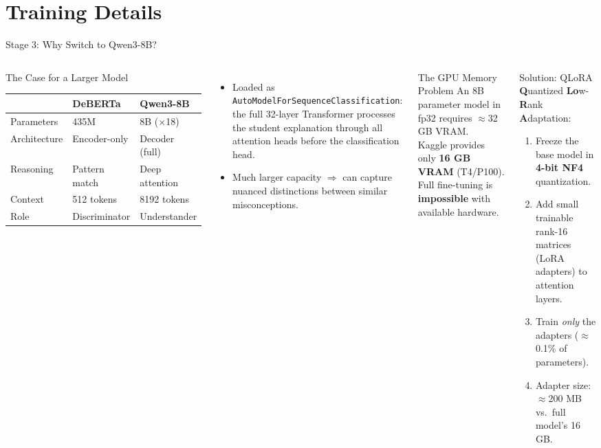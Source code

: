 ﻿\documentclass[aspectratio=169,10pt]{beamer}
\begin{document}
\section{Training Details}

\begin{frame}[shrink=4]{Stage 3: Why Switch to Qwen3-8B?}
\begin{columns}[T]
\begin{block}{The Case for a Larger Model}
\begin{tabular}{lll}
\toprule
 & \textbf{DeBERTa} & \textbf{Qwen3-8B}\\
\midrule
Parameters & 435M & 8B ($\times$18)\\
Architecture & Encoder-only & Decoder (full)\\
Reasoning & Pattern match & Deep attention\\
Context & 512 tokens & 8192 tokens\\
Role & Discriminator & Understander\\
\bottomrule
\end{tabular}
\end{block}
\vspace{8pt}
\begin{itemize}
  \item Loaded as \texttt{AutoModelForSequenceClassification}: the full 32-layer Transformer processes the student explanation through all attention heads before the classification head.
  \item Much larger capacity $\Rightarrow$ can capture nuanced distinctions between similar misconceptions.
\end{itemize}
\begin{alertblock}{The GPU Memory Problem}
An 8B parameter model in fp32 requires $\approx$32 GB VRAM.\\
Kaggle provides only \textbf{16 GB VRAM} (T4/P100).\\[6pt]
Full fine-tuning is \textbf{impossible} with available hardware.
\end{alertblock}
\vspace{8pt}
\begin{exampleblock}{Solution: QLoRA}
\textbf{Q}uantized \textbf{Lo}w-\textbf{R}ank \textbf{A}daptation:\\
\begin{enumerate}
  \item Freeze the base model in \textbf{4-bit NF4} quantization.
  \item Add small trainable rank-16 matrices (LoRA adapters) to attention layers.
  \item Train \textit{only} the adapters ($\approx$0.1\% of parameters).
  \item Adapter size: $\approx$200 MB vs.\ full model's 16 GB.
\end{enumerate}
\end{exampleblock}
\end{columns}
\end{frame}
\end{document}

